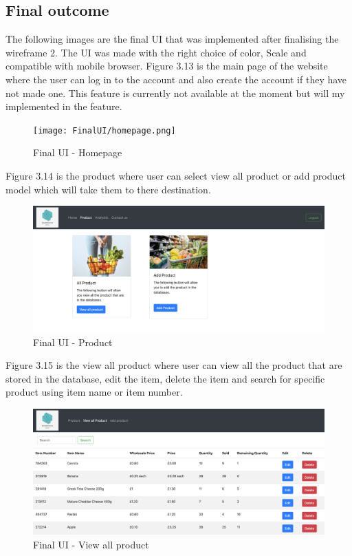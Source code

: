 \newpage
\subsection{Final outcome}
The following images are the final UI that was implemented after finalising the wireframe 2. The UI was made with the right choice of color, Scale and compatible with mobile browser.\newline
\newline Figure 3.13 is the main page of the website where the user can log in to the account and also create the account if they have not made one. This feature is currently not available at the moment but will my implemented in the feature.

\begin{figure}[h]
\centering
    \texttt{[image: FinalUI/homepage.png]}
    \caption{Final UI - Homepage}
    \label{fig:Final UI - Homepage}
\end{figure}

\newpage
Figure 3.14 is the product where user can select view all product or add product model which will take them to there destination. 
\begin{figure}[H]
\centering
    \includegraphics[scale=0.27]
    {FinalUI/product.png}
    \caption{Final UI - Product}
    \label{fig:Final UI - product}
\end{figure}

Figure 3.15 is the view all product where user can view all the product that are stored in the database, edit the item, delete the item and search for specific product using item name or item number.
\begin{figure}[H]
\centering
    \includegraphics[scale=0.27]
    {FinalUI/viewallproduct.png}
    \caption{Final UI - View all product}
    \label{fig:Final UI - view all product}
\end{figure}

